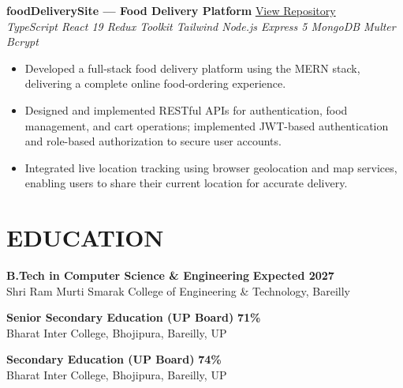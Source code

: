 \documentclass[10.5pt,a4paper]{article}
\newcommand{\role}[2]{%
  {\bfseries\color{primary} #1} \hfill {\bfseries\small #2}%
}
\newcommand{\projectline}[2]{%
  {\bfseries\color{primary} #1} \hfill {\small\color{secondary} #2}%
}
\begin{document}
\vspace{3pt}
\projectline{foodDeliverySite --- Food Delivery Platform}{\href{https://github.com/Amjadkhan9756/foodDeliverySite}{View Repository}}\\
{\small\textit{TypeScript \;\textbullet\; React 19 \;\textbullet\; Redux Toolkit \;\textbullet\; Tailwind \;\textbullet\; Node.js \;\textbullet\; Express 5 \;\textbullet\; MongoDB \;\textbullet\; Multer \;\textbullet\; Bcrypt}}
\begin{itemize}
  \item Developed a full-stack food delivery platform using the MERN stack, delivering a complete online food-ordering experience.
  \item Designed and implemented RESTful APIs for authentication, food management, and cart operations; implemented JWT-based authentication and role-based authorization to secure user accounts.
  \item Integrated live location tracking using browser geolocation and map services, enabling users to share their current location for accurate delivery.
\end{itemize}

\section{EDUCATION}

\role{B.Tech in Computer Science \& Engineering}{Expected 2027}\\
{\small Shri Ram Murti Smarak College of Engineering \& Technology, Bareilly}

\vspace{5pt}

\role{Senior Secondary Education (UP Board)}{71\% \;\textbullet\; 2022}\\
{\small Bharat Inter College, Bhojipura, Bareilly, UP}

\vspace{5pt}

\role{Secondary Education (UP Board)}{74\% \;\textbullet{}}\\
{\small Bharat Inter College, Bhojipura, Bareilly, UP}

\end{document}
